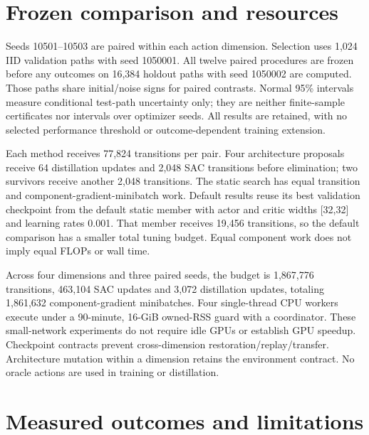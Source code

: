 \section{Frozen comparison and resources}
Seeds 10501--10503 are paired within each action dimension. Selection uses
1,024 IID validation paths with seed 1050001. All twelve paired procedures
are frozen before any outcomes on 16,384 holdout paths with seed 1050002
are computed. Those paths share initial/noise signs for paired contrasts.
Normal 95\% intervals measure conditional test-path uncertainty only; they
are neither finite-sample certificates nor intervals over optimizer seeds.
All results are retained, with no selected performance threshold or
outcome-dependent training extension.

Each method receives 77,824 transitions per pair. Four architecture proposals
receive 64 distillation updates and 2,048 SAC transitions before elimination;
two survivors receive another 2,048 transitions. The static search has equal
transition and component-gradient-minibatch work. Default results reuse its
best validation checkpoint from the default static member with actor and
critic widths [32,32] and learning rates 0.001. That member receives 19,456
transitions, so the default comparison has a smaller total tuning budget.
Equal component work does not imply equal FLOPs or wall time.

Across four dimensions and three paired seeds, the budget is 1,867,776
transitions, 463,104 SAC updates and 3,072 distillation updates, totaling
1,861,632 component-gradient minibatches. Four single-thread CPU workers
execute under a 90-minute, 16-GiB owned-RSS guard with a coordinator. These
small-network experiments do not require idle GPUs or establish GPU speedup.
Checkpoint contracts prevent cross-dimension restoration/replay/transfer.
Architecture mutation within a dimension retains the environment contract.
No oracle actions are used in training or distillation.

\section{Measured outcomes and limitations}

